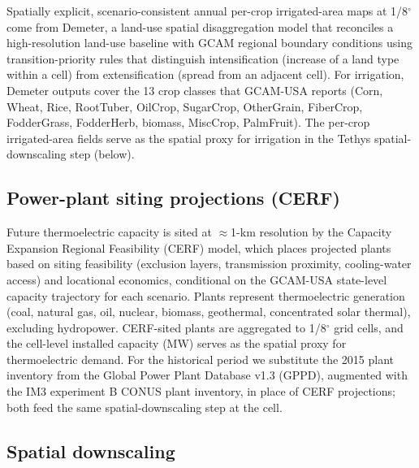 \documentclass[fleqn,10pt]{wlscirep}
\begin{document}
Spatially explicit, scenario-consistent annual per-crop irrigated-area maps at 1/8$^{\circ}$ come from Demeter\cite{Vernon-2018}, a land-use spatial disaggregation model that reconciles a high-resolution land-use baseline with GCAM regional boundary conditions using transition-priority rules that distinguish intensification (increase of a land type within a cell) from extensification (spread from an adjacent cell). For irrigation, Demeter outputs cover the 13 crop classes that GCAM-USA reports (Corn, Wheat, Rice, RootTuber, OilCrop, SugarCrop, OtherGrain, FiberCrop, FodderGrass, FodderHerb, biomass, MiscCrop, PalmFruit). The per-crop irrigated-area fields serve as the spatial proxy for irrigation in the Tethys spatial-downscaling step (below).

\subsection*{Power-plant siting projections (CERF)}

Future thermoelectric capacity is sited at $\approx$1-km resolution by the Capacity Expansion Regional Feasibility (CERF) model\cite{Vernon2021,Mongird2025CERF}, which places projected plants based on siting feasibility (exclusion layers, transmission proximity, cooling-water access) and locational economics, conditional on the GCAM-USA state-level capacity trajectory for each scenario. Plants represent thermoelectric generation (coal, natural gas, oil, nuclear, biomass, geothermal, concentrated solar thermal), excluding hydropower. CERF-sited plants are aggregated to 1/8$^{\circ}$ grid cells, and the cell-level installed capacity (MW) serves as the spatial proxy for thermoelectric demand. For the historical period we substitute the 2015 plant inventory from the Global Power Plant Database v1.3 (GPPD), augmented with the IM3 experiment B CONUS plant inventory, in place of CERF projections; both feed the same spatial-downscaling step at the cell.

\subsection*{Spatial downscaling}
\end{document}
